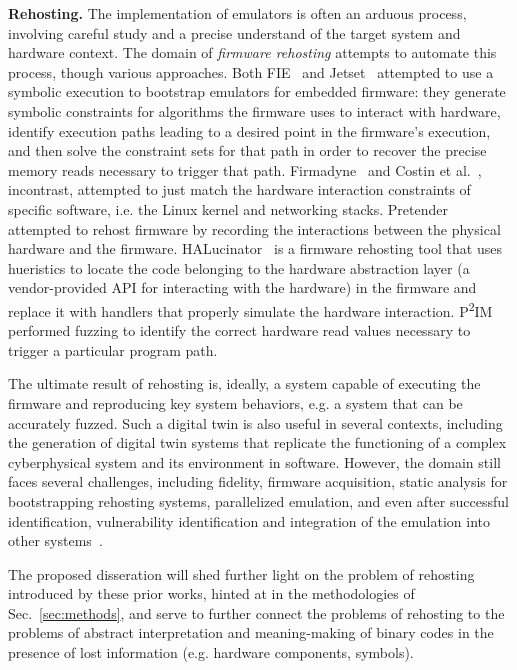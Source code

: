 \textbf{Rehosting.} The implementation of emulators is often an arduous process, involving careful study and a precise understand of the target system and hardware context. 
The domain of \emph{firmware rehosting} attempts to automate this process, though various approaches.
Both FIE~\cite{fie} and Jetset~\cite{johnson2021jetset} attempted to use a symbolic execution to bootstrap emulators for embedded firmware: they generate symbolic constraints for algorithms the firmware uses to interact with hardware, identify execution paths leading to a desired point in the firmware's execution, and then solve the constraint sets for that path in order to recover the precise memory reads necessary to trigger that path.
Firmadyne~\cite{firmadyne} and Costin et al.~\cite{costin2014large, costin2016automated}, incontrast, attempted to just match the hardware interaction constraints of specific software, i.e. the Linux kernel and networking stacks.
Pretender~\cite{pretender2019} attempted to rehost firmware by recording the interactions between the physical hardware and the firmware. 
HALucinator~\cite{clementshalucinator} is a firmware rehosting tool that uses hueristics to locate the code belonging to the hardware abstraction layer (a vendor-provided API for interacting with the hardware) in the firmware and replace it with handlers that properly simulate the hardware interaction.
P\textsuperscript{2}IM~\cite{p2im2020} performed fuzzing to identify the correct hardware read values necessary to trigger a particular program path. 

The ultimate result of rehosting is, ideally, a system capable of executing the firmware and reproducing key system behaviors, e.g. a system that can be accurately fuzzed. 
Such a digital twin is also useful in several contexts, including the generation of digital twin systems that replicate the functioning of a complex cyberphysical system and its environment in software.
However, the domain still faces several challenges, including fidelity, firmware acquisition, static analysis for bootstrapping rehosting systems, parallelized emulation, and even after successful identification, vulnerability identification and integration of the emulation into other systems~\cite{wright2021challenges}.

The proposed disseration will shed further light on the problem of rehosting introduced by these prior works, hinted at in the methodologies of Sec.~\ref{sec:methods}, and serve to further connect the problems of rehosting to the problems of abstract interpretation and meaning-making of binary codes in the presence of lost information (e.g. hardware components, symbols).

